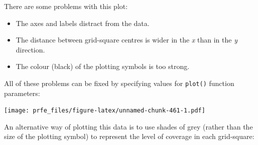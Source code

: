 \documentclass[12pt,a4paper]{book}
\newenvironment{Shaded}{\begin{snugshade}}{\end{snugshade}}
\newcommand{\DataTypeTok}[1]{\textcolor[rgb]{0.13,0.29,0.53}{#1}}
\newcommand{\DecValTok}[1]{\textcolor[rgb]{0.00,0.00,0.81}{#1}}
\newcommand{\FloatTok}[1]{\textcolor[rgb]{0.00,0.00,0.81}{#1}}
\newcommand{\KeywordTok}[1]{\textcolor[rgb]{0.13,0.29,0.53}{\textbf{#1}}}
\newcommand{\NormalTok}[1]{#1}
\newcommand{\OperatorTok}[1]{\textcolor[rgb]{0.81,0.36,0.00}{\textbf{#1}}}
\newcommand{\OtherTok}[1]{\textcolor[rgb]{0.56,0.35,0.01}{#1}}
\newcommand{\StringTok}[1]{\textcolor[rgb]{0.31,0.60,0.02}{#1}}
\theoremstyle{definition}
\theoremstyle{definition}
\theoremstyle{definition}
\theoremstyle{remark}
\begin{document}
There are some problems with this plot:

\begin{itemize}
\item
  The axes and labels distract from the data.
\item
  The distance between grid-square centres is wider in the \emph{x} than
  in the \emph{y} direction.
\item
  The colour (black) of the plotting symbols is too strong.
\end{itemize}

All of these problems can be fixed by specifying values for
\texttt{plot()} function parameters:

\begin{Shaded}
\end{Shaded}

\texttt{[image: prfe\_files/figure-latex/unnamed-chunk-461-1.pdf]}

An alternative way of plotting this data is to use shades of grey
(rather than the size of the plotting symbol) to represent the level of
coverage in each grid-square:

\begin{Shaded}
\end{Shaded}
\end{document}
